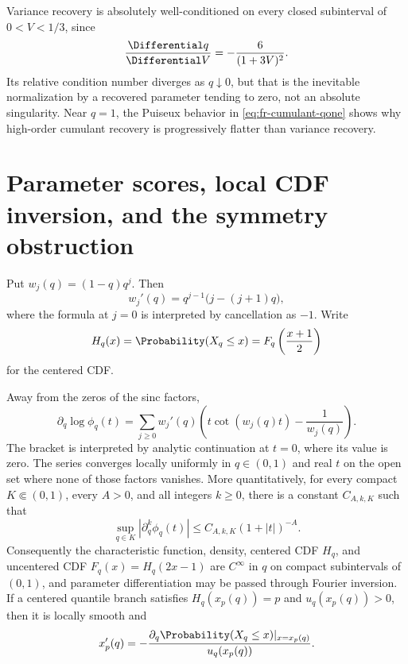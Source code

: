 Variance recovery is absolutely well-conditioned on every closed
subinterval of \(0<V<1/3\), since
\[
 \frac{\Differential q}{\Differential V}=-\frac6{(1+3V)^2}.
\]
Its relative condition number diverges as \(q\downarrow0\), but that is the
inevitable normalization by a recovered parameter tending to zero, not an
absolute singularity.  Near \(q=1\), the Puiseux behavior in
\cref{eq:fr-cumulant-qone} shows why high-order cumulant recovery is
progressively flatter than variance recovery.

\section{Parameter scores, local CDF inversion, and the symmetry obstruction}
\label{sec:fr-cdf-inverse}

Put \(w_j(q)=(1-q)q^j\).  Then
\[
 w_j'(q)=q^{j-1}\bigl(j-(j+1)q\bigr),
\]
where the formula at \(j=0\) is interpreted by cancellation as \(-1\).
Write
\[
 H_q(x)=\Probability(X_q\le x)=F_q\left(\frac{x+1}{2}\right)
\]
for the centered CDF.

\begin{proposition}
\label{prop:fr-fourier-score}
Away from the zeros of the sinc factors,
\begin{equation}
 \partial_q\log\phi_q(t)
 =\sum_{j\ge0}w_j'(q)
 \left(t\cot(w_j(q)t)-\frac1{w_j(q)}\right).
 \label{eq:fr-fourier-score}
\end{equation}
The bracket is interpreted by analytic continuation at \(t=0\), where its
value is zero.
The series converges locally uniformly in \(q\in(0,1)\) and real \(t\) on the
open set where none of those factors vanishes.  More quantitatively, for every
compact \(K\Subset(0,1)\), every \(A>0\), and all integers \(k\ge0\), there is
a constant \(C_{A,k,K}\) such that
\begin{equation}
 \sup_{q\in K}\left|\partial_q^k\phi_q(t)\right|
 \le C_{A,k,K}(1+|t|)^{-A}.
 \label{eq:fr-q-derivative-rapid}
\end{equation}
Consequently the characteristic function, density, centered CDF \(H_q\), and
uncentered CDF \(F_q(x)=H_q(2x-1)\) are \(C^\infty\) in \(q\) on compact
subintervals of \((0,1)\), and parameter differentiation may be passed
through Fourier inversion.  If a centered quantile branch satisfies
\(H_q(x_p(q))=p\) and \(u_q(x_p(q))>0\), then it is locally smooth and
\begin{equation}
 x_p'(q)=-\frac{\partial_q\Probability(X_q\le x)|_{x=x_p(q)}}{u_q(x_p(q))}.
 \label{eq:fr-quantile-sensitivity}
\end{equation}
\end{proposition}

